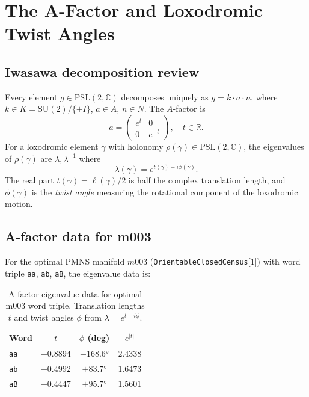 \documentclass[floatfix,aps,prd,twocolumn,showpacs,superscriptaddress,longbibliography]{revtex4-2}
\newcommand{\PSL}{\mathrm{PSL}(2,\mathbb{C})}
\newcommand{\SUtwo}{\mathrm{SU}(2)}
\begin{document}
\section{The A-Factor and Loxodromic Twist Angles}
\label{sec:afactor}

\subsection{Iwasawa decomposition review}

Every element $g \in \PSL$ decomposes uniquely as $g = k \cdot a \cdot n$,
where $k \in K = \SUtwo/\{\pm I\}$, $a \in A$, $n \in N$.
The $A$-factor is
\begin{equation}
a = \begin{pmatrix} e^t & 0 \\ 0 & e^{-t} \end{pmatrix}, \quad t \in \mathbb{R}.
\end{equation}
For a loxodromic element $\gamma$ with holonomy $\rho(\gamma) \in \PSL$,
the eigenvalues of $\rho(\gamma)$ are $\lambda, \lambda^{-1}$ where
\begin{equation}
\lambda(\gamma) = e^{t(\gamma) + i\phi(\gamma)}.
\label{eq:eigenvalue}
\end{equation}
The real part $t(\gamma) = \ell(\gamma)/2$ is half the complex
translation length, and $\phi(\gamma)$ is the \emph{twist angle}
measuring the rotational component of the loxodromic motion.

\subsection{A-factor data for m003}

For the optimal PMNS manifold $m003$
(\texttt{OrientableClosedCensus}[1]) with word triple
\texttt{aa}, \texttt{ab}, \texttt{aB}, the eigenvalue data is:

\begin{table}[h]
\centering
\caption{A-factor eigenvalue data for optimal m003 word triple.
Translation lengths $t$ and twist angles $\phi$ from
$\lambda = e^{t+i\phi}$.}
\label{tab:afactor}
\begin{tabular}{lccc}
\toprule
Word & $t$ & $\phi$ (deg) & $e^{|t|}$ \\
\midrule
\texttt{aa} & $-0.8894$ & $-168.6°$ & $2.4338$ \\
\texttt{ab} & $-0.4992$ & $+83.7°$  & $1.6473$ \\
\texttt{aB} & $-0.4447$ & $+95.7°$  & $1.5601$ \\
\bottomrule
\end{tabular}
\end{table}
\end{document}
